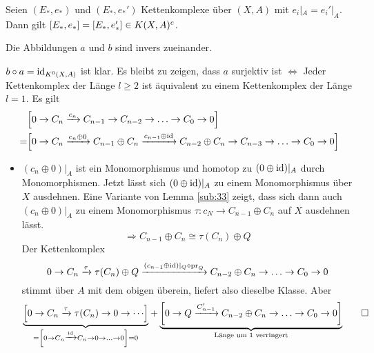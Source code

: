 \begin{lemma}[label=sub:lemma_3_1_5]
Seien $(E_*,e_*)$ und $(E_*,e_*')$ Kettenkomplexe über $(X,A)$ mit $e_i|_A = e_i'|_A$. Dann gilt $\benbrace*{E_*,e_*} = \benbrace*{E_*,e_*'} \in K(X,A)^c$.	
\end{lemma}


\begin{lemma}[label=sub:lemma_3_1_6]
Die Abbildungen $a$ und $b$ sind invers zueinander.	
\end{lemma}
\begin{beweis}
$b \circ a= \id_{K^0(X,A)}$ ist klar. Es bleibt zu zeigen, dass $a$ surjektiv ist $\iff$ Jeder Kettenkomplex der Länge $l \ge 2$ ist äquivalent zu einem Kettenkomplex der
Länge $l=1$. Es gilt
\begin{align*}
	&\benbrace*{0 \to C_n \xrightarrow{c_n} C_{n-1} \to C_{n-2} \to \ldots \to C_0 \to 0 } \\
	= &\benbrace*{0 \to C_n \xrightarrow{c_n \oplus 0} C_{n-1} \oplus C_n \xrightarrow{c_{n-1} \oplus \id} C_{n-2} \oplus C_n \to C_{n-3} \to \ldots \to C_0 \to 0 } 
\end{align*}
\begin{itemize}
	\item $(c_n \oplus 0)|_A$ ist ein Monomorphismus und homotop zu $(0 \oplus \id)|_A$ durch Monomorphismen. Jetzt lässt sich $(0 \oplus \id)|_A$ zu einem Monomorphismus 
	über $X$ ausdehnen. Eine Variante von Lemma \ref{sub:33} zeigt, dass sich dann auch $(c_n \oplus 0)|_A$ zu einem Monomorphismus $\tau \colon c_N \to C_{n-1} \oplus C_n$
	auf $X$ ausdehnen lässt.
	\[
		\Rightarrow C_{n-1} \oplus C_n \cong \tau (C_n) \oplus  Q
	\]
	Der Kettenkomplex 
	\[
		0 \to C_n \xrightarrow{\tau} \tau(C_n) \oplus Q \xrightarrow{(c_{n-1} \oplus \id)|_Q \circ \pr_Q} C_{n-2} \oplus C_n \to \ldots \to C_0 \to 0  
	\]
	stimmt über $A$ mit dem obigen überein, liefert also dieselbe Klasse. Aber
	\begin{align*}
		\Underbrace{\benbrace*{0\to C_n \xrightarrow{\tau} \tau(C_n) \to 0  \to \cdots }}{= \benbrace*{0 \to C_n \xrightarrow{\id} C_n \to 0 \to \ldots \to 0 }=0 } + 
		\Underbrace{\benbrace*{0 \to Q \xrightarrow{C_{n-1}'} C_{n-2} \oplus C_n \to \ldots \to C_0 \to 0 } }{\text{Länge um 1 verringert}} \qedhere
	\end{align*}
\end{itemize}	
\end{beweis}


